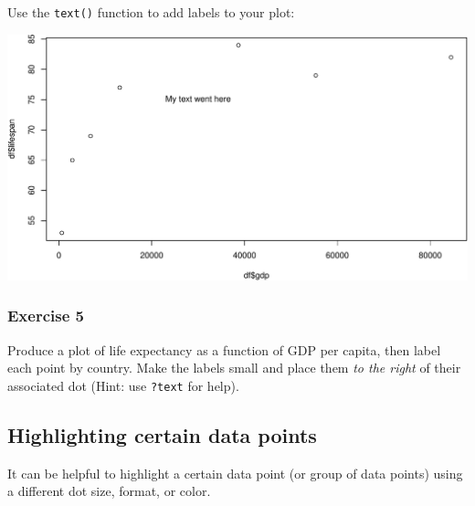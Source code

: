 \documentclass[
]{book}
\newenvironment{Shaded}{\begin{snugshade}}{\end{snugshade}}
\newcommand{\DataTypeTok}[1]{\textcolor[rgb]{0.13,0.29,0.53}{#1}}
\newcommand{\DecValTok}[1]{\textcolor[rgb]{0.00,0.00,0.81}{#1}}
\newcommand{\KeywordTok}[1]{\textcolor[rgb]{0.13,0.29,0.53}{\textbf{#1}}}
\newcommand{\NormalTok}[1]{#1}
\newcommand{\OperatorTok}[1]{\textcolor[rgb]{0.81,0.36,0.00}{\textbf{#1}}}
\newcommand{\StringTok}[1]{\textcolor[rgb]{0.31,0.60,0.02}{#1}}
\begin{document}
Use the \texttt{text()} function to add labels to your plot:

\begin{Shaded}
\end{Shaded}

\includegraphics{figures/unnamed-chunk-120-1.pdf}

\hypertarget{exercise-5-1}{%
\subsubsection*{Exercise 5}\label{exercise-5-1}}

Produce a plot of life expectancy as a function of GDP per capita, then label each point by country. Make the labels small and place them \emph{to the right} of their associated dot (Hint: use \texttt{?text} for help).

\hypertarget{highlighting-certain-data-points}{%
\subsection*{Highlighting certain data points}\label{highlighting-certain-data-points}}

It can be helpful to highlight a certain data point (or group of data points) using a different dot size, format, or color.
\end{document}
